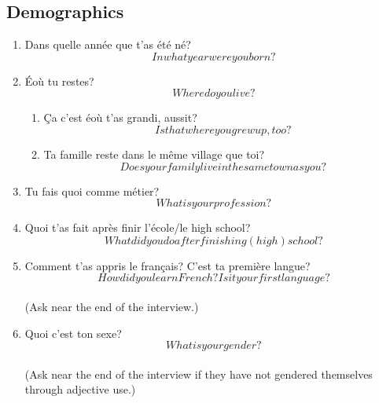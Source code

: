 
\ifdefined \longtrans
\else
  \newcommand{\longtrans}[1]{\[#1\]}
\fi
\newcommand{\setting}[1]{\textbf{#1}}

\subsection{Demographics}
  \begin{enumerate}
    \item Dans quelle année que t'as été né?\\
      \longtrans{In what year were you born?}
    \item Éoù tu restes?\\
      \longtrans{Where do you live?}
    \begin{enumerate}
      \item Ça c'est éoù t'as grandi, aussit?\\
        \longtrans{Is that where you grew up, too?}
      \item Ta famille reste dans le même village que toi?\\
        \longtrans{Does your family live in the same town as you?}
    \end{enumerate}
    \item Tu fais quoi comme métier?\\
      \longtrans{What is your profession?}
    \item Quoi t'as fait après finir l'école/le high school?\\
      \longtrans{What did you do after finishing (high) school?}
    \item Comment t'as appris le français? C'est ta première langue?\\
      \longtrans{How did you learn French? Is it your first language?}\\
      (Ask near the end of the interview.)
    \item Quoi c'est ton sexe?\\
      \longtrans{What is your gender?}\\
      (Ask near the end of the interview if they have not gendered themselves through adjective use.)

\end{enumerate}
